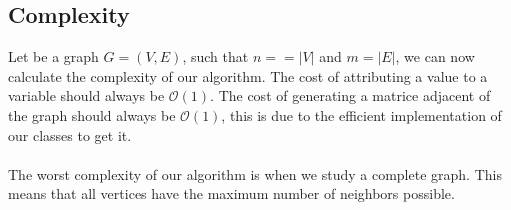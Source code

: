 
\subsection{Complexity}

    Let be a graph $G = (V,E)$, such that $n = =|V|$ and $m = |E|$, we can now calculate the complexity of our algorithm. The cost of attributing a value to a variable should always be $\mathcal{O}(1)$. The cost of generating a matrice adjacent of the graph should always be $\mathcal{O}(1)$, this is due to the efficient implementation of our classes to get it.
    \\ \\
    The worst complexity of our algorithm is when we study a complete graph. This means that all vertices have the maximum number of neighbors possible. 